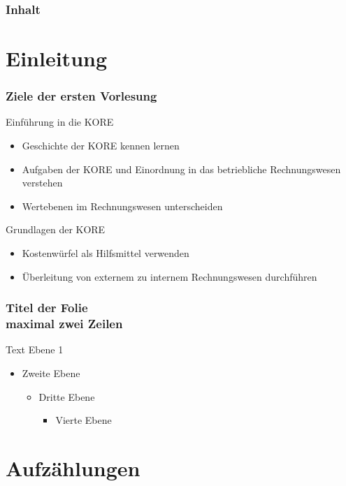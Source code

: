 \begin{frame}
  \frametitle{Inhalt}
  \tableofcontents%
\end{frame}


\section{Einleitung}
\begin{frame}
	\frametitle{Ziele der ersten Vorlesung}
	Einführung in die KORE
	\begin{itemize}
		\item Geschichte der KORE kennen lernen
		\item Aufgaben der KORE und Einordnung in das betriebliche Rechnungswesen verstehen
		\item Wertebenen im Rechnungswesen unterscheiden
	\end{itemize}
	
	Grundlagen der KORE
	\begin{itemize}
		\item Kostenwürfel als Hilfsmittel verwenden
		\item Überleitung von externem zu internem Rechnungswesen durchführen
	\end{itemize}
\end{frame}

\begin{frame}
	\frametitle{Titel der Folie\\maximal zwei Zeilen}
	Text Ebene 1
	\begin{itemize}
		\item Zweite Ebene
		\begin{itemize}
			\item Dritte Ebene
			\begin{itemize}
				\item Vierte Ebene
			\end{itemize}
		\end{itemize}
	\end{itemize}
\end{frame}

\section{Aufzählungen}

